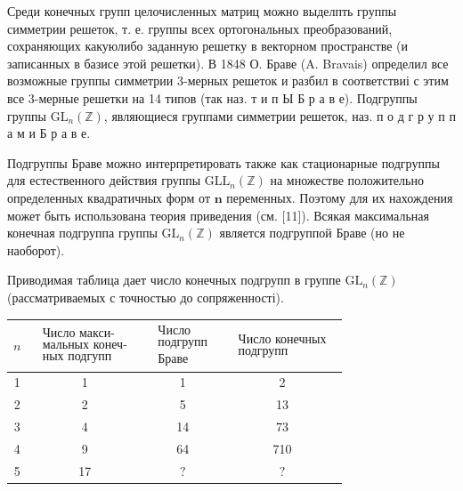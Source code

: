 \documentclass[10pt]{article}
\begin{document}
Среди конечных групп целочисленных матриц можно выделпть группы симметрии решеток, т. е. группы всех ортогональных преобразований, сохраняющих какуюлибо заданную решетку в векторном пространстве (и записанных в базисе этой решетки). В 1848 О. Браве (A. Bravais) определил все возможные группы симметрии 3-мерных решеток и разбил в соответствиі с этим все 3-мерные решетки на 14 типов (так наз. т и п Ы Б р а в е). Подгруппы группы $\mathrm{GL}_{n}(\mathbb{Z})$, являющиеся группами симметрии решеток, наз. п о д г р у п п а м и Б р а в е.



Подгруппы Браве можно интерпретировать также как стационарные подгруппы для естественного действия группы $\mathrm{GL} \mathrm{L}_{n}(\mathbb{Z})$ на множестве положительно определенных квадратичных форм от $\boldsymbol{n}$ переменных. Поэтому для их нахождения может быть использована теория приведения (см. [11]). Всякая максимальная конечная подгруппа группы $\mathrm{GL}_{n}(\mathbb{Z})$ является подгруппой Браве (но не наоборот).



Приводимая таблица дает число конечных подгрупп в группе $\mathrm{GL}_{n}(\mathbb{Z})$ (рассматриваемых с точностью до сопряженності).



\begin{center}

\begin{tabular}{c|c|c|c}

\hline

$n$ & $\begin{array}{c}\text { Число макси- } \\ \text { мальных конеч- } \\ \text { ных подгупп }\end{array}$ & $\begin{array}{c}\text { Число } \\ \text { подгрупп } \\ \text { Браве }\end{array}$ & $\begin{array}{c}\text { Число конечных } \\ \text { подгрупп }\end{array}$ \\

\hline

1 & 1 & 1 & 2 \\

2 & 2 & 5 & 13 \\

3 & 4 & 14 & 73 \\

4 & 9 & 64 & 710 \\

5 & 17 & $?$ & $?$ \\

\hline

\end{tabular}

\end{center}
\end{document}
